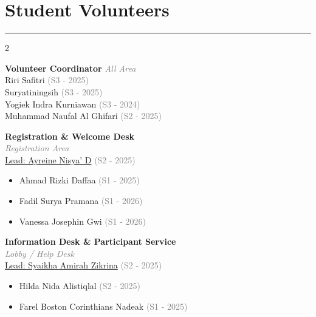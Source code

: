\documentclass[10pt,a4paper]{article}
\begin{document}
\section{\textbf{Student Volunteers}}
\color{conf}\rule{\linewidth}{1pt}\color{black}
\vspace{0.5em}
\begin{multicols}{2}
\raggedcolumns

\begin{minipage}{\linewidth}
\textbf{\color{conf}Volunteer Coordinator} \textcolor{gray}{\emph{All Area}}\\
Riri Safitri \textcolor{gray}{(S3 - 2025)}\\ 
Suryatiningsih \textcolor{gray}{(S3 - 2025)}\\ 
Yogiek Indra Kurniawan \textcolor{gray}{(S3 - 2024)}\\
Muhammad Naufal Al Ghifari \textcolor{gray}{(S2 - 2025)}\\
\end{minipage}
\vspace{0.8em}

\begin{minipage}{\linewidth}
\textbf{\color{conf}Registration \& Welcome Desk}\\
\textcolor{gray}{\emph{Registration Area}}\\
\small \underline{Lead: Ayreine Nisya' D} \textcolor{gray}{(S2 - 2025)}\\
\begin{itemize}\setlength{\itemsep}{0pt}
  \item Ahmad Rizki Daffaa \textcolor{gray}{(S1 - 2025)}
  \item Fadil Surya Pramana \textcolor{gray}{(S1 - 2026)}
  \item Vanessa Josephin Gwi \textcolor{gray}{(S1 - 2026)}
\end{itemize}
\end{minipage}
\vspace{0.8em}

\begin{minipage}{\linewidth}
\textbf{\color{conf}Information Desk \& Participant Service}\\\textcolor{gray}{\emph{Lobby / Help Desk}}\\
\small \underline{Lead: Syaikha Amirah Zikrina} \textcolor{gray}{(S2 - 2025)}\\
\begin{itemize}\setlength{\itemsep}{0pt}
  \item Hilda Nida Alistiqlal \textcolor{gray}{(S2 - 2025)}
  \item Farel Boston Corinthians Nadeak \textcolor{gray}{(S1 - 2025)}
\end{itemize}
\end{minipage}
\vspace{0.8em}


\end{multicols}
\end{document}
